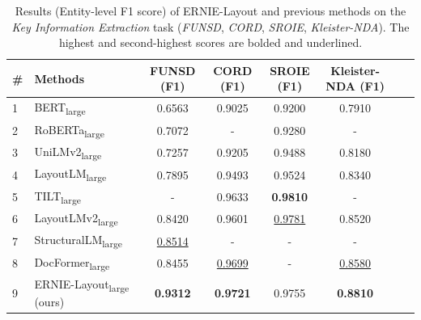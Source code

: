\documentclass[11pt]{article}
\begin{document}
\begin{table}[t]
\centering
\small
\begin{tabular}{llcccccc}
\toprule
\# & \textbf{Methods} & \textbf{FUNSD} (F1) & \textbf{CORD} (F1) & \textbf{SROIE} (F1) & \textbf{Kleister-NDA} (F1) \\
\midrule
1 & BERT\textsubscript{large}~\cite{liu2019roberta}      & 0.6563 & 0.9025 & 0.9200 & 0.7910 \\
2 & RoBERTa\textsubscript{large}~\cite{liu2019roberta}   & 0.7072 & - & 0.9280 & -  \\
3 & UniLMv2\textsubscript{large}~\cite{bao2020unilmv2}   & 0.7257 & 0.9205 & 0.9488 & 0.8180  \\
\midrule
4 & LayoutLM\textsubscript{large}~\cite{xu2020layoutlm}            & 0.7895 & 0.9493 & 0.9524 & 0.8340 \\
5 & TILT\textsubscript{large}~\cite{powalski2021going}             & -      & 0.9633 & \textbf{0.9810} & - \\
6 & LayoutLMv2\textsubscript{large}~\cite{xu2021layoutlmv2}        & 0.8420 & 0.9601 & \underline{0.9781} & 0.8520 \\
7 & StructuralLM\textsubscript{large}~\cite{li2021structurallm}    & \underline{0.8514} & -      & -      & - \\
8 & DocFormer\textsubscript{large}~\cite{appalaraju2021docformer}  & 0.8455 & \underline{0.9699} & -      & \underline{0.8580} \\
\midrule
\midrule
9 & ERNIE-Layout\textsubscript{large} (ours)  & \textbf{0.9312} & \textbf{0.9721} & 0.9755 & \textbf{0.8810} \\ 
\bottomrule
\end{tabular}
\caption{Results (Entity-level F1 score) of ERNIE-Layout and previous methods on the \emph{Key Information Extraction} task (\emph{FUNSD}, \emph{CORD}, \emph{SROIE}, \emph{Kleister-NDA}). The highest and second-highest scores are bolded and underlined.}
\label{tab:main_result_ner}
\end{table}
\end{document}
